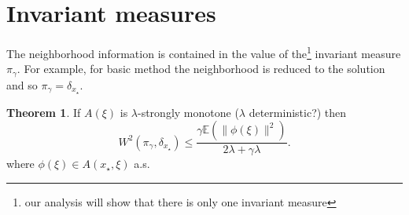 \documentclass{article}
\newcommand{\1}{\mathbbm 1}
\newcommand{\bE}{{{\mathbb E}}}
\theoremstyle{definition}
\newtheorem{theorem}{Theorem}
\begin{document}
\section{Invariant measures}

The neighborhood information is contained in the value of the\footnote{our analysis will show that there is only one invariant measure} invariant measure $\pi_\gamma$.
For example, for basic method the neighborhood is reduced to the solution and so $\pi_\gamma = \delta_{x_\star}$.

\begin{theorem}
    If $A(\xi)$ is $\lambda$-strongly monotone ($\lambda$ deterministic?) then
    \begin{equation}
        W^2(\pi_\gamma,\delta_{x_\star}) \leq \frac{\gamma \bE(\|\phi(\xi)\|^2)}{2\lambda + \gamma\lambda}.
    \end{equation}
    where $\phi(\xi) \in A(x_\star,\xi)$ a.s.
\end{theorem}
\end{document}
